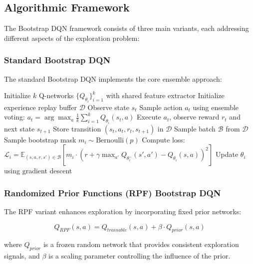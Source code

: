 \documentclass[12pt]{article}
\begin{document}
{{{\subsection{Algorithmic Framework}

The Bootstrap DQN framework consists of three main variants, each addressing different aspects of the exploration problem:

\subsubsection{Standard Bootstrap DQN}
The standard Bootstrap DQN implements the core ensemble approach:

\begin{algorithm}[H]
\caption{Standard Bootstrap DQN Training}
\begin{algorithmic}[1]
\STATE Initialize $k$ Q-networks $\{Q_{\theta_i}\}_{i=1}^k$ with shared feature extractor
\STATE Initialize experience replay buffer $\mathcal{D}$
        \STATE Observe state $s_t$
        \STATE Sample action $a_t$ using ensemble voting: $a_t = \arg\max_a \frac{1}{k}\sum_{i=1}^k Q_{\theta_i}(s_t, a)$
        \STATE Execute $a_t$, observe reward $r_t$ and next state $s_{t+1}$
        \STATE Store transition $(s_t, a_t, r_t, s_{t+1})$ in $\mathcal{D}$
            \STATE Sample batch $\mathcal{B}$ from $\mathcal{D}$
                \STATE Sample bootstrap mask $m_i \sim \text{Bernoulli}(p)$
                \STATE Compute loss: $\mathcal{L}_i = \mathbb{E}_{(s,a,r,s') \in \mathcal{B}}[m_i \cdot (r + \gamma \max_{a'} Q_{\theta_i^-}(s', a') - Q_{\theta_i}(s, a))^2]$
                \STATE Update $\theta_i$ using gradient descent
            \ENDFOR
        \ENDIF
    \ENDFOR
\ENDFOR
\end{algorithmic}
\end{algorithm}

\subsubsection{Randomized Prior Functions (RPF) Bootstrap DQN}
The RPF variant enhances exploration by incorporating fixed prior networks:

\begin{equation}
Q_{RPF}(s,a) = Q_{trainable}(s,a) + \beta \cdot Q_{prior}(s,a)
\end{equation}

where $Q_{prior}$ is a frozen random network that provides consistent exploration signals, and $\beta$ is a scaling parameter controlling the influence of the prior.

}}}
\end{document}
